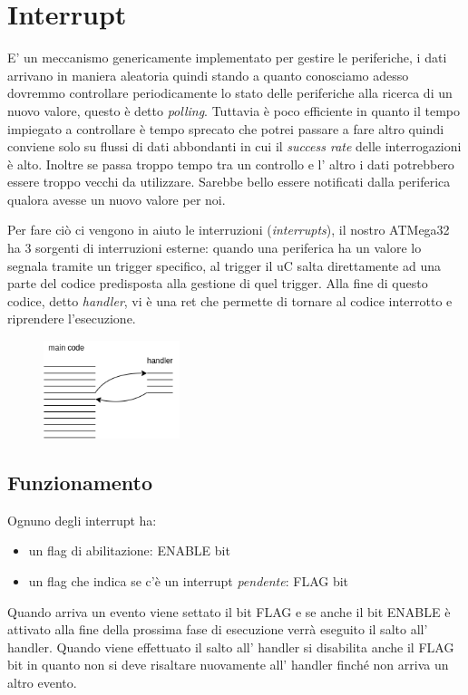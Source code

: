 \section{Interrupt}
E' un meccanismo genericamente implementato per gestire le periferiche, i dati arrivano in maniera aleatoria quindi stando a quanto conosciamo adesso dovremmo controllare periodicamente lo stato delle periferiche alla ricerca di un nuovo valore, questo è detto \emph{polling}.
Tuttavia è poco efficiente in quanto il tempo impiegato a controllare è tempo sprecato che potrei passare a fare altro quindi conviene solo su flussi di dati abbondanti in cui il \emph{success rate} delle interrogazioni è alto.
Inoltre se passa troppo tempo tra un controllo e l' altro i dati potrebbero essere troppo vecchi da utilizzare. 
Sarebbe bello essere notificati dalla periferica qualora avesse un nuovo valore per noi.

Per fare ciò ci vengono in aiuto le interruzioni (\emph{interrupts}), il nostro ATMega32 ha 3 sorgenti di interruzioni esterne: quando una periferica ha un valore lo segnala tramite un trigger specifico, al trigger il uC salta direttamente ad una parte del codice predisposta alla gestione di quel trigger.
Alla fine di questo codice, detto \emph{handler}, vi è una ret che permette di tornare al codice interrotto e riprendere l'esecuzione.

\begin{figure}[H]
    \centering
    \includegraphics[width=150px]{images/15_Interrupt/interrupt_example.png}
\end{figure}

\subsection{Funzionamento}
Ognuno degli interrupt ha:
\begin{itemize}
    \item un flag di abilitazione: ENABLE bit
    \item un flag che indica se c'è un interrupt \emph{pendente}: FLAG bit
\end{itemize}
Quando arriva un evento viene settato il bit FLAG e se anche il bit ENABLE è attivato alla fine della prossima fase di esecuzione verrà eseguito il salto all' handler.
Quando viene effettuato il salto all' handler si disabilita anche il FLAG bit in quanto non si deve risaltare nuovamente all' handler finché non arriva un altro evento.

